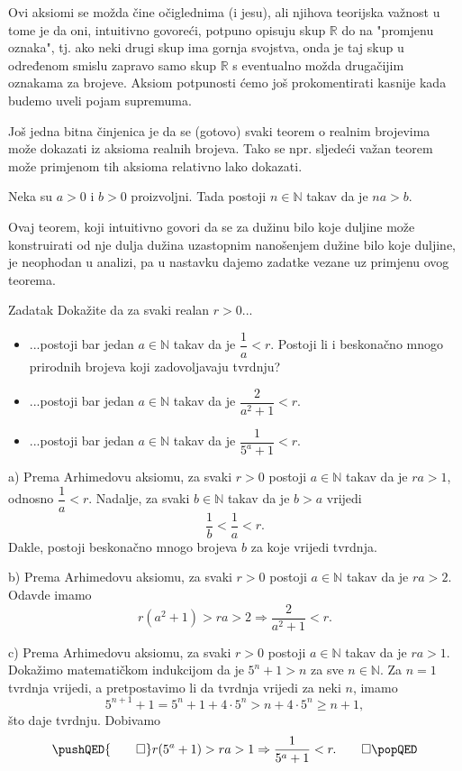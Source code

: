 Ovi aksiomi se možda čine očiglednima (i jesu), ali njihova teorijska važnost u tome je da oni, intuitivno govoreći, potpuno opisuju skup $\mathbb{R}$ do na "promjenu oznaka", tj. ako neki drugi skup ima gornja svojstva, onda je taj skup u određenom smislu zapravo samo skup $\mathbb{R}$ s eventualno možda drugačijim oznakama za brojeve. Aksiom potpunosti ćemo još prokomentirati kasnije kada budemo uveli pojam supremuma.

Još jedna bitna činjenica je da se (gotovo) svaki teorem o realnim brojevima može dokazati iz aksioma realnih brojeva. Tako se npr. sljedeći važan teorem može primjenom tih aksioma relativno lako dokazati. 
\begin{remark}
Neka su \(a>0\) i \(b>0\) proizvoljni. Tada postoji \(n\in \mathbb{N}\) takav da je \(na>b\).
\end{remark}
Ovaj teorem, koji intuitivno govori da se za dužinu bilo koje duljine može konstruirati od nje dulja dužina uzastopnim nanošenjem dužine bilo koje duljine, je neophodan u analizi, pa u nastavku dajemo zadatke vezane uz primjenu ovog teorema.
\begin{exercise}{Zadatak} Dokažite da za svaki realan \(r>0\)...
\begin{itemize}
\item[a)] ...postoji bar jedan \(a\in \mathbb{N}\) takav da je \(\dfrac{1}{a}<r\). Postoji li i beskonačno mnogo prirodnih brojeva koji zadovoljavaju tvrdnju?
\item[b)] ...postoji bar jedan \(a\in \mathbb{N}\) takav da je \(\dfrac{2}{a^2+1}<r\).
\item[c)] ...postoji bar jedan \(a\in \mathbb{N}\) takav da je \(\dfrac{1}{5^a+1}<r\).
\end{itemize}
\end{exercise}
\begin{proof*}
a) Prema Arhimedovu aksiomu, za svaki \(r>0\) postoji \(a\in \mathbb{N}\) takav da je \(ra>1\), odnosno \(\dfrac{1}{a}<r\). Nadalje, za svaki \(b\in \mathbb{N}\) takav da je \(b>a\) vrijedi \[\dfrac{1}{b}<\dfrac{1}{a}<r.\]
Dakle, postoji beskonačno mnogo brojeva $b$ za koje vrijedi tvrdnja.

b) Prema Arhimedovu aksiomu, za svaki \(r>0\) postoji \(a\in \mathbb{N}\) takav da je \(ra>2\). Odavde imamo
$$r(a^2+1)>ra>2\Rightarrow \dfrac{2}{a^2+1}<r.$$

c) Prema Arhimedovu aksiomu, za svaki \(r>0\) postoji \(a\in \mathbb{N}\) takav da je \(ra>1\). Dokažimo matematičkom indukcijom da je $5^n+1>n$ za sve $n\in \mathbb{N}$. Za $n=1$ tvrdnja vrijedi, a pretpostavimo li da tvrdnja vrijedi za neki $n$, imamo
$$5^{n+1}+1=5^n+1+4\cdot 5^n>n+4\cdot 5^n\geq n+1,$$
što daje tvrdnju. Dobivamo
\[\pushQED{\qed}
r(5^a+1)>ra>1\Rightarrow \dfrac{1}{5^a+1}<r. \qedhere
\popQED
\]
\end{proof*}

